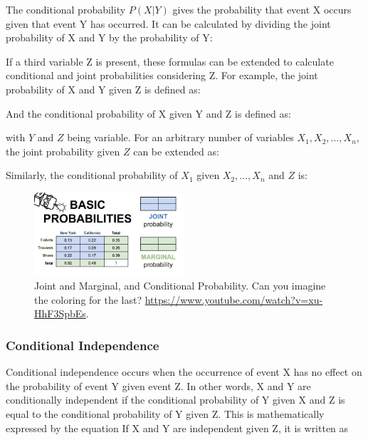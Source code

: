 
The conditional probability $P(X|Y)$ gives the probability that event X occurs given that event Y has occurred. It can be calculated by dividing the joint probability of X and Y by the probability of Y:


If a third variable Z is present, these formulas can be extended to calculate conditional and joint probabilities considering Z. For example, the joint probability of X and Y given Z is defined as:


And the conditional probability of X given Y and Z is defined as:


with $Y$ and $Z$ being variable. For an arbitrary number of variables \(X_1, X_2, \ldots, X_n\), the joint probability given \(Z\) can be extended as:


Similarly, the conditional probability of \(X_1\) given \(X_2, \ldots, X_n\) and \(Z\) is:


\begin{figure}
    \centering
    \includegraphics[width=0.5\textwidth]{../images/plot_joint_marginal_conditional.png.jpg}
    \caption{Joint and Marginal, and Conditional Probability. Can you imagine the coloring for the last? \url{https://www.youtube.com/watch?v=xu-HhF3SpbEs}.}
    \label{fig:joint_marginal_conditional}
\end{figure}

\subsubsection{Conditional Independence}\label{Conditional Independence} 
Conditional independence occurs when the occurrence of event X has no effect on the probability of event Y given event Z. In other words, X and Y are conditionally independent if the conditional probability of Y given X and Z is equal to the conditional probability of Y given Z. This is mathematically expressed by the equation 
If X and Y are independent given Z, it is written as 

